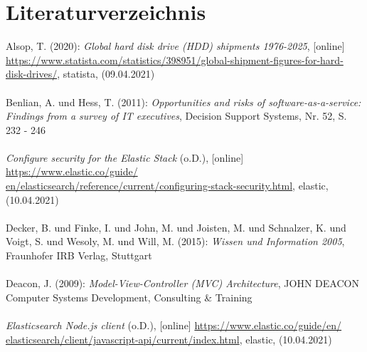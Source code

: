 \documentclass[a4paper]{scrartcl}
\begin{document}

\newpage


\setcounter{page}{6}


\section*{Literaturverzeichnis}

\singlespacing

Alsop, T. (2020): \textit{Global hard disk drive (HDD) shipments 1976-2025}, [online] \\ \href{https://www.statista.com/statistics/398951/global-shipment-figures-for-hard-disk-drives/}{https://www.statista.com/statistics/398951/global-shipment-figures-for-hard- \\ disk-drives/}, statista, (09.04.2021) \\ \\
Benlian, A. und Hess, T. (2011): \textit{Opportunities and risks of software-as-a-service: Findings from a survey of IT executives}, Decision Support Systems, Nr. 52, S. 232 - 246 \\ \\
\textit{Configure security for the Elastic Stack} (o.D.), [online] \href{https://www.elastic.co/guide/en/elasticsearch/reference/current/configuring-stack-security.html}{https://www.elastic.co/guide/ \\ en/elasticsearch/reference/current/configuring-stack-security.html}, elastic, \\ (10.04.2021) \\ \\
Decker, B. und Finke, I. und John, M. und Joisten, M. und Schnalzer, K. und Voigt, S. und Wesoly, M. und Will, M. (2015): \textit{Wissen und Information 2005}, Fraunhofer IRB Verlag, Stuttgart \\ \\
Deacon, J. (2009): \textit{Model-View-Controller (MVC) Architecture}, JOHN DEACON Computer Systems Development, Consulting \& Training \\ \\
\textit{Elasticsearch Node.js client} (o.D.), [online] \href{https://www.elastic.co/guide/en/elasticsearch/client/javascript-api/current/index.html}{https://www.elastic.co/guide/en/ \\ elasticsearch/client/javascript-api/current/index.html}, elastic, (10.04.2021) \\ \\
\end{document}
